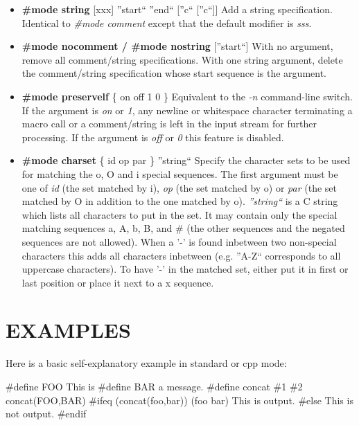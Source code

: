 \begin{itemize}
\item {\bf \#mode string }[xxx] ''start`` ''end`` [''c`` [''c``]]\htmlBR
Add a string specification. Identical to {\it \#mode comment} except that the
default modifier is {\it sss}. 

\item {\bf \#mode nocomment / \#mode nostring }[''start``]\htmlBR
With no argument, remove all comment/string specifications. With one string
argument, delete the comment/string specification whose start sequence is the
argument. 

\item {\bf \#mode preservelf }\{ on {\htmlBar} off {\htmlBar} 1 {\htmlBar} 0
\}\htmlBR
Equivalent to the {\it -n} command-line switch. If the argument is {\it on} or
{\it 1}, any newline or whitespace character terminating a macro call or a
comment/string is left in the input stream for further processing. If the
argument is {\it off} or {\it 0} this feature is disabled. 

\item {\bf \#mode charset }\{ id {\htmlBar} op {\htmlBar} par \}
''string``\htmlBR
Specify the character sets to be used for matching the {\htmlBackslash}o,
{\htmlBackslash}O and {\htmlBackslash}i special sequences. The first argument
must be one of {\it id} (the set matched by {\htmlBackslash}i), {\it op} (the
set matched by {\htmlBackslash}o) or {\it par} (the set matched by
{\htmlBackslash}O in addition to the one matched by {\htmlBackslash}o). {\it
''string``} is a C string which lists all characters to put in the set. It may
contain only the special matching sequences {\htmlBackslash}a,
{\htmlBackslash}A, {\htmlBackslash}b, {\htmlBackslash}B, and
{\htmlBackslash}\# (the other sequences and the negated sequences are not
allowed). When a '-' is found inbetween two non-special characters this adds
all characters inbetween (e.g. ''A-Z`` corresponds to all uppercase
characters). To have '-' in the matched set, either put it in first or last
position or place it next to a {\htmlBackslash}x sequence. 
\end{itemize}

\htmlHR

\section{EXAMPLES}

Here is a basic self-explanatory example in standard or cpp mode: 

\begin{PRE}
  \#define FOO This is
  \#define BAR a message.
  \#define concat \#1 \#2
  concat(FOO,BAR)
  \#ifeq (concat(foo,bar)) (foo bar)
  This is output.
  \#else
  This is not output.
  \#endif
\end{PRE}

